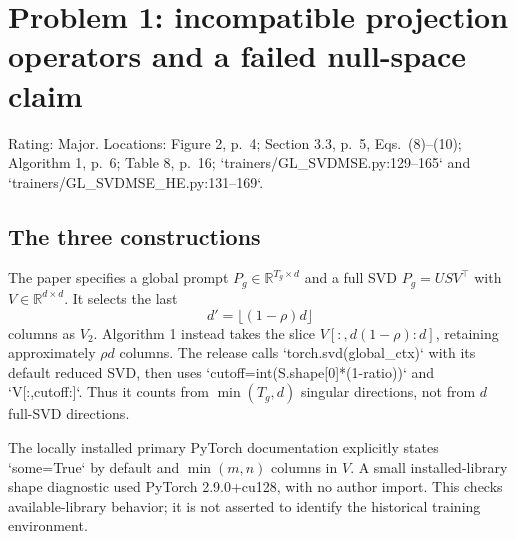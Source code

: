 \documentclass[10pt]{article}
\begin{document}
\section*{Problem 1: incompatible projection operators and a failed null-space claim}
Rating: Major. Locations: Figure 2, p. 4; Section 3.3, p. 5, Eqs. (8)–(10); Algorithm 1, p. 6; Table 8, p. 16; `trainers/GL\_SVDMSE.py:129–165` and `trainers/GL\_SVDMSE\_HE.py:131–169`.\par
\subsection*{The three constructions}
The paper specifies a global prompt \(P_g\in\mathbb R^{T_g\times d}\) and a full SVD \(P_g=USV^\top\) with \(V\in\mathbb R^{d\times d}\). It selects the last \[d'=\lfloor(1-\rho)d\rfloor\] columns as \(V_2\). Algorithm 1 instead takes the slice \(V[:,d(1-\rho):d]\), retaining approximately \(\rho d\) columns. The release calls `torch.svd(global\_ctx)` with its default reduced SVD, then uses `cutoff=int(S.shape[0]*(1-ratio))` and `V[:,cutoff:]`. Thus it counts from \(\min(T_g,d)\) singular directions, not from \(d\) full-SVD directions.\par
The locally installed primary PyTorch documentation explicitly states `some=True` by default and \(\min(m,n)\) columns in \(V\). A small installed-library shape diagnostic used PyTorch 2.9.0+cu128, with no author import. This checks available-library behavior; it is not asserted to identify the historical training environment.\par
\end{document}
